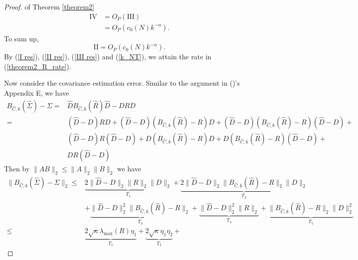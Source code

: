 \begin{proof}{ of Theorem \ref{theorem2}}
\begin{equation}
        \begin{split}
            \mathrm{IV} &= O_P( \mathrm{III} ) \\
            &= O_P(c_0(N) k^{-\alpha}) .
        \end{split} 
        \label{VI}
    \end{equation}
    To sum up, 
    \begin{equation}
    	\mathrm{II} = O_P( c_0(N) k^{-\alpha}  ). 
    	\label{II res}
    \end{equation}
    By (\ref{I res}), (\ref{II res}), (\ref{III res}) and (\ref{k_NT}), we attain the rate in (\ref{theorem2_R_rate}).
    
    Now consider the covariance estimation error. Similar to the argument in (\cite{liu2014EC2})'s Appendix E, we have 
    \begin{equation}
    	\begin{split}
    		B_{\hat C, k}(\hat \Sigma) - \Sigma =& \hat D B_{\hat C, k}(\hat R) \hat D - DRD \\
            =& (\hat D - D) R D + (\hat D - D) (B_{\hat C, k}(\hat R) - R) D + (\hat D - D) (B_{\hat C, k}(\hat R) - R) (\hat D - D) + \\
        	& (\hat D - D) R (\hat D - D) + D (B_{\hat C, k}(\hat R) - R) D + D (B_{\hat C, k}(\hat R) - R) (\hat D - D) + \\
            & DR(\hat D - D)
    	\end{split}
        \label{cov decompose}
    \end{equation}
    Then by $\|AB\|_2 \leq \|A\|_2 \|B\|_2$ we have 
    \begin{equation}
        \begin{split}
            \lVert B_{\hat C, k}(\hat \Sigma) - \Sigma \rVert_2 \leq & 
                \underbrace{ 2 \lVert \hat D -	D \rVert_2 \lVert R \rVert_2 \lVert D \rVert_2 }_{T_1} + 
                \underbrace{ 2\lVert \hat D - D \rVert_2 \lVert B_{\hat C, k}(\hat R) - R \rVert_2 \lVert D \rVert_2 }_{T_2} \\
            & + \underbrace{ \lVert \hat D - D \rVert_2^2 \lVert B_{\hat C, k}(\hat R) - R \rVert_2 }_{T_3} + 
                \underbrace{ \lVert \hat D - D \rVert_2^2 \lVert R \rVert_2 }_{T_4} + 
                \underbrace{ \lVert B_{\hat C, k}(\hat R) - R \rVert_2 \lVert D \rVert_2^2 }_{T_5} \\
            \leq & \underbrace{ 2 \sqrt{\kappa} \lambda_{\max } (R) \eta_1     }_{T_1} + 
                \underbrace{ 2\sqrt{\kappa} \eta_1 \eta_2}_{T_2} + 

\end{split}
\end{equation}
\end{proof}
